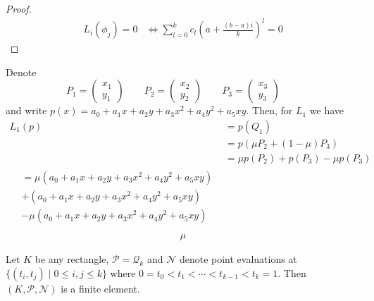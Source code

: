 \begin{proof}
    \begin{align}
        L_i (\phi_j) = 0 & \iff \sum_{l=0}^k c_l \left( a + \frac{(b-a) i}{k} \right)^l = 0
    \end{align}
\end{proof}

\begin{example}
    Denote
    \begin{equation}
        P_1 = \begin{pmatrix}
            x_1 \\ y_1
        \end{pmatrix} \qquad
        P_2 = \begin{pmatrix}
            x_2 \\ y_2
        \end{pmatrix} \qquad
        P_3 = \begin{pmatrix}
            x_3 \\ y_3
        \end{pmatrix} \qquad
    \end{equation}
    and write \(p(x) = a_0 + a_1 x + a_2 y + a_3 x^2 + a_4 y^2 + a_5 xy\). Then, for \(L_1\) we have
    \begin{align}
        L_1 (p) &= p(Q_1) \\
        &= p(\mu P_2 + (1 - \mu)P_3) \\
        &= \mu p (P_2) + p (P_3) - \mu p (P_3) \\
        \begin{split}
            &= \mu \left( a_0 + a_1 x + a_2 y + a_3 x^2 + a_4 y^2 + a_5 xy \right) \\
            & + \left( a_0 + a_1 x + a_2 y + a_3 x^2 + a_4 y^2 + a_5 xy \right) \\
            & - \mu \left( a_0 + a_1 x + a_2 y + a_3 x^2 + a_4 y^2 + a_5 xy \right) \\
        \end{split}
    \end{align}
    \begin{align}
        \mu
    \end{align}
\end{example}

\begin{example}
    Let \(K\) be any rectangle, \(\mathcal{P} = \mathcal{Q}_k\) and \(\mathcal{N}\) denote point evaluations at \(\{(t_i, t_j) \mid 0 \leq i, j \leq k\}\) where \(0 = t_0 < t_1 < \cdots < t_{k-1} < t_k = 1\). Then \((K, \mathcal{P}, \mathcal{N})\) is a finite element.
\end{example}